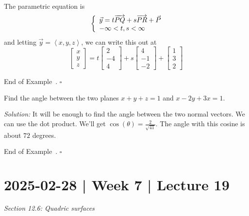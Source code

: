 \documentclass[10pt]{article}
\theoremstyle{definition}
\newtheorem{example}[theorem]{Example}
\renewenvironment{example}
{\begin{oldexample}}
  {\par\smallskip\hfill   End of Example~\theexample. $\square$    \par\end{oldexample}}
\newcommand{\1}[1]{\textbf{1}_{\left[#1\right]}} %
\begin{document}
\begin{example}
  The parametric equation is
  \begin{equation*}
    \left\{ \begin{array}{l@{}l} \vec{y}  = t \overrightarrow{PQ} + s \overrightarrow{PR} + \vec{P} \\ -\infty<t,s<\infty  \end{array}\right.
  \end{equation*}
  and letting $\vec{y}= \left\langle x,y,z \right\rangle $, we can write this out at
  \begin{equation*}
    \begin{bmatrix}
      x\\y\\z
    \end{bmatrix}
    =
    t
    \begin{bmatrix}
      2\\-4\\4
    \end{bmatrix}
    +
    s
    \begin{bmatrix}
      4\\-1\\-2
    \end{bmatrix}
    +
    \begin{bmatrix}
      1\\3\\2
    \end{bmatrix}
  \end{equation*}
\end{example}

\begin{example}
  Find the angle between the two planes $x+y+z=1$ and $x-2y+3x=1$.

  \textit{Solution:} It will be enough to find the angle between the two normal
  vectors. We can use the dot product. We'll get
  $\cos(\theta) = \frac{2}{\sqrt{41}}$. The angle with this cosine is about $72$
  degrees.
\end{example}

\newpage

\section{2025-02-28 | Week 7 | Lecture 19}
\textit{Section 12.6: Quadric surfaces}
\end{document}
